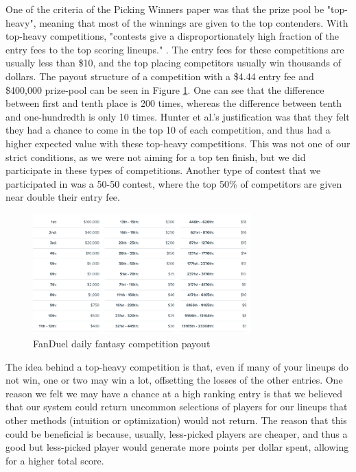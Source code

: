 One of the criteria of the Picking Winners paper was that the prize pool be "top-heavy", meaning that most of the winnings are given to the top contenders. With top-heavy competitions, "contests give a disproportionately high fraction of the entry fees to the top scoring lineups." \cite{picking_winners}. The entry fees for these competitions are usually less than \$10, and the top placing competitors usually win thousands of dollars. The payout structure of a competition with a \$4.44 entry fee and \$400,000 prize-pool can be seen in Figure \ref{fig:comp_payout}. One can see that the difference between first and tenth place is 200 times, whereas the difference between tenth and one-hundredth is only 10 times. Hunter  et al.'s \cite{picking_winners} justification was that they felt they had a chance to come in the top 10 of each competition, and thus had a higher expected value with these top-heavy competitions. This was not one of our strict conditions, as we were not aiming for a top ten finish, but we did participate in these types of competitions. Another type of contest that we participated in was a 50-50 contest, where the top 50\% of competitors are given near double their entry fee. 

\begin{figure}[ht]
    \centering
    \includegraphics[width=0.75\textwidth]{figures/fantasy_competition_payout}
    \caption{FanDuel daily fantasy competition payout}
    \label{fig:comp_payout}
\end{figure}

The idea behind a top-heavy competition is that, even if many of your lineups do not win, one or two may win a lot, offsetting the losses of the other entries. One reason we felt we may have a chance at a high ranking entry is that we believed that our system could return uncommon selections of players for our lineups that other methods (intuition or optimization) would not return. The reason that this could be beneficial is because, usually, less-picked players are cheaper, and thus a good but less-picked player would generate more points per dollar spent, allowing for a higher total score.

